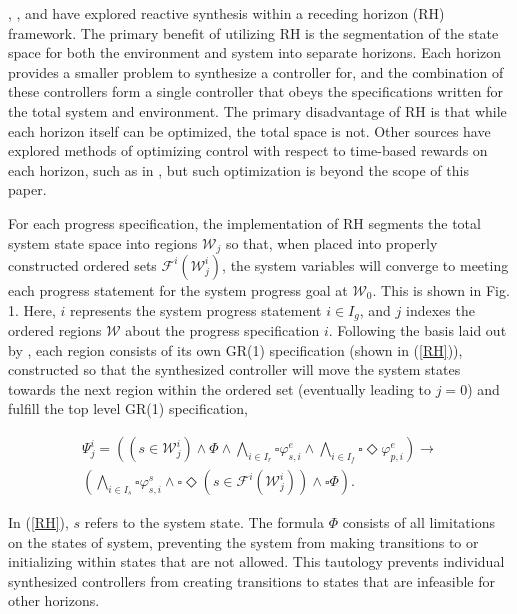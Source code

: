 \documentclass{ieeeaccess}
\newcommand{\always}{\square}
\newcommand{\eventually}{\Diamond}
\begin{document}
\cite{c8}, \cite{c9}, and \cite{c10} have explored reactive synthesis within a receding horizon (RH) framework. The primary benefit of utilizing RH is the segmentation of the state space for both the environment and system into separate horizons. Each horizon provides a smaller problem to synthesize a controller for, and the combination of these controllers form a single controller that obeys the specifications written for the total system and environment. The primary disadvantage of RH is that while each horizon itself can be optimized, the total space is not. Other sources have explored methods of optimizing control with respect to time-based rewards on each horizon, such as in \cite{c9}, but such optimization is beyond the scope of this paper.

For each progress specification, the implementation of RH segments the total system state space into regions $\mathcal{W}_j$ so that, when placed into properly constructed ordered sets $\mathcal{F}^i(\mathcal{W}_j^i)$, the system variables will converge to meeting each progress statement for the system progress goal at $\mathcal{W}_0$. This is shown in Fig. 1. Here, $i$ represents the system progress statement $i \in I_g$, and $j$ indexes the ordered regions $\mathcal{W}$ about the progress specification $i$. Following the basis laid out by \cite{c10}, each region consists of its own GR(1) specification (shown in (\ref{RH})), constructed so that the synthesized controller will move the system states towards the next region within the ordered set (eventually leading to $j = 0$) and fulfill the top level GR(1) specification,

\begin{equation}
\label{RH}
\begin{aligned}
\Psi_{j}^{i} = ((s \in \mathcal{W}_j^i) \land \Phi \land \bigwedge_{i \in I_r} \always \varphi_{s,i}^{e} \land \bigwedge_{i \in I_f} \always \eventually \varphi_{p,i}^{e}) \longrightarrow \\
(\bigwedge_{i \in I_s} \always \varphi_{s,i}^{s} \land \always \eventually(s \in \mathcal{F}^i(\mathcal{W}_j^i)) \land \always \Phi).
\end{aligned}
\end{equation}

In (\ref{RH}), $s$ refers to the system state. The formula $\Phi$ consists of all limitations on the states of system, preventing the system from making transitions to or initializing within states that are not allowed. This tautology prevents individual synthesized controllers from creating transitions to states that are infeasible for other horizons.
\end{document}
